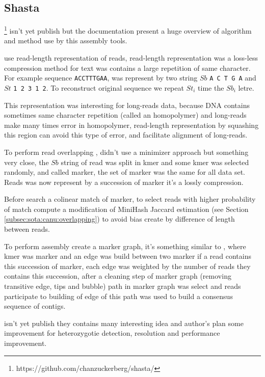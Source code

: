\documentclass[main]{subfiles}
\begin{document}
\subsection{Shasta}

\newcommand{\shasta}{}

\shasta\footnote{https://github.com/chanzuckerberg/shasta/} isn't yet publish but the documentation present a huge overview of algorithm and method use by this assembly tools.

\shasta use read-length representation of reads, read-length representation was a loss-less compression method for text was contains a large repetition of same character. For example sequence \texttt{ACCTTTGAA}, was represent by two string $Sb$ \texttt{A C T G A} and $St$ \texttt{1 2 3 1 2}. To reconstruct original sequence we repeat $St_i$ time the $Sb_i$ letre.

This representation was interesting for long-reads data, because DNA contains sometimes same character repetition (called an homopolymer) and long-reads make many times error in homopolymer, read-length representation by squashing this region can avoid this type of error, and facilitate alignment of long-reads.

To perform read overlapping \shasta, didn't use a minimizer approach but something very close, the $Sb$ string of read was split in kmer and some kmer was selected randomly, and called marker, the set of marker was the same for all data set. Reads was now represent by a succession of marker it's a lossly compression.

Before search a colinear match of marker, to select reads with higher probability of match \shasta compute a modification of MiniHash Jaccard estimation (see Section \ref{subsec:sota:canu:overlapping}) to avoid bias create by difference of length between reads.

To perform assembly \shasta create a marker graph, it's something similar to \DBG, where kmer was marker and an edge was build between two marker if a read contains this succession of marker, each edge was weighted by the number of reads they contains this succession, after a cleaning step of marker graph (removing transitive edge, tips and bubble) path in marker graph was select and reads participate to building of edge of this path was used to build a consensus sequence of contigs.

\shasta isn't yet publish they contains many interesting idea and author's plan some improvement for heterozygotie detection, resolution and performance improvement.
\end{document}
